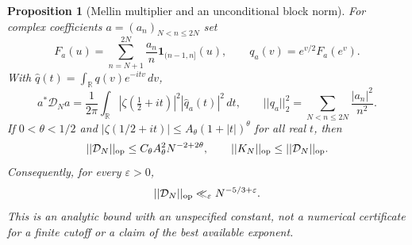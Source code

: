 \documentclass[11pt]{article}
\def\norm#1{||#1||}%
\newtheorem{proposition}[theorem]{Proposition}
\theoremstyle{remark}
\newcommand{\norm}[1]{\left\lVert #1\right\rVert}
\begin{document}
\begin{proposition}[Mellin multiplier and an unconditional block norm]
\label{prop:v158-mellin-budget}
For complex coefficients $a=(a_n)_{N<n\leq2N}$ set
\[
 F_a(u)=\sum_{n=N+1}^{2N}\frac{a_n}{n}\mathbf1_{(n-1,n]}(u),
 \qquad q_a(v)=e^{v/2}F_a(e^v).
\]
With $\widehat q(t)=\int_{\mathbb R}q(v)e^{-itv}\,dv$,
\begin{equation}
 a^*\mathcal D_Na
 =\frac1{2\pi}\int_{\mathbb R}
       |\zeta(\tfrac12+it)|^2|\widehat q_a(t)|^2\,dt,
 \qquad
 \norm{q_a}_2^2=\sum_{N<n\leq2N}\frac{|a_n|^2}{n^2}.
 \label{eq:v158-mellin-identity}
\end{equation}
If $0<\theta<1/2$ and
$|\zeta(1/2+it)|\leq A_\theta(1+|t|)^\theta$ for all real $t$, then
\begin{equation}
 \norm{\mathcal D_N}_{\rm op}
 \leq C_\theta A_\theta^2 N^{-2+2\theta},
 \qquad \norm{K_N}_{\rm op}\leq\norm{\mathcal D_N}_{\rm op}.
 \label{eq:v158-zeta-budget}
\end{equation}
Consequently, for every $\varepsilon>0$,
\begin{equation}
 \norm{\mathcal D_N}_{\rm op}\ll_\varepsilon N^{-5/3+\varepsilon}.
 \label{eq:v158-weyl-budget}
\end{equation}
This is an analytic bound with an unspecified constant, not a numerical
certificate for a finite cutoff or a claim of the best available exponent.
\end{proposition}
\end{document}
